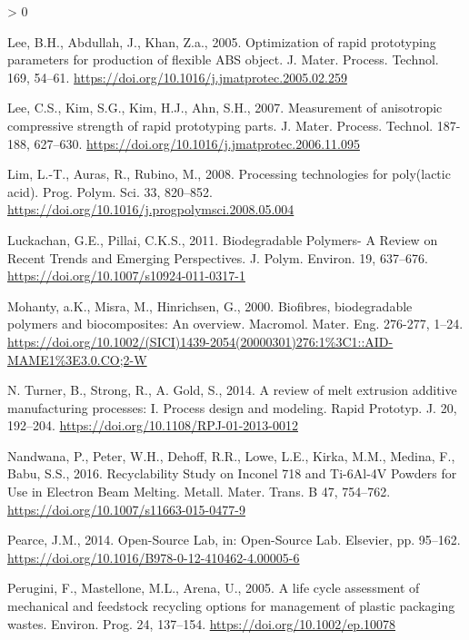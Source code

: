 \documentclass[
]{article}
\newlength{\cslhangindent}
\newenvironment{CSLReferences}[2] %
 {%
  \setlength{\parindent}{0pt}
  \ifodd #1 \everypar{\setlength{\hangindent}{\cslhangindent}}\ignorespaces\fi
  \ifnum #2 > 0
  \setlength{\parskip}{#2\baselineskip}
  \fi
 }%
 {}
\begin{document}
\begin{CSLReferences}{1}{0}
\leavevmode\hypertarget{ref-Lee2005}{}%
Lee, B.H., Abdullah, J., Khan, Z.a., 2005. {Optimization of rapid prototyping parameters for production of flexible ABS object}. J. Mater. Process. Technol. 169, 54--61. \url{https://doi.org/10.1016/j.jmatprotec.2005.02.259}

\leavevmode\hypertarget{ref-Lee2007}{}%
Lee, C.S., Kim, S.G., Kim, H.J., Ahn, S.H., 2007. {Measurement of anisotropic compressive strength of rapid prototyping parts}. J. Mater. Process. Technol. 187-188, 627--630. \url{https://doi.org/10.1016/j.jmatprotec.2006.11.095}

\leavevmode\hypertarget{ref-Lim2008}{}%
Lim, L.-T., Auras, R., Rubino, M., 2008. {Processing technologies for poly(lactic acid)}. Prog. Polym. Sci. 33, 820--852. \url{https://doi.org/10.1016/j.progpolymsci.2008.05.004}

\leavevmode\hypertarget{ref-Luckachan2011}{}%
Luckachan, G.E., Pillai, C.K.S., 2011. {Biodegradable Polymers- A Review on Recent Trends and Emerging Perspectives}. J. Polym. Environ. 19, 637--676. \url{https://doi.org/10.1007/s10924-011-0317-1}

\leavevmode\hypertarget{ref-Mohanty2000}{}%
Mohanty, a.K., Misra, M., Hinrichsen, G., 2000. {Biofibres, biodegradable polymers and biocomposites: An overview}. Macromol. Mater. Eng. 276-277, 1--24. \url{https://doi.org/10.1002/(SICI)1439-2054(20000301)276:1\%3C1::AID-MAME1\%3E3.0.CO;2-W}

\leavevmode\hypertarget{ref-NTurner2014}{}%
N. Turner, B., Strong, R., A. Gold, S., 2014. {A review of melt extrusion additive manufacturing processes: I. Process design and modeling}. Rapid Prototyp. J. 20, 192--204. \url{https://doi.org/10.1108/RPJ-01-2013-0012}

\leavevmode\hypertarget{ref-Raugel2015}{}%
Nandwana, P., Peter, W.H., Dehoff, R.R., Lowe, L.E., Kirka, M.M., Medina, F., Babu, S.S., 2016. {Recyclability Study on Inconel 718 and Ti-6Al-4V Powders for Use in Electron Beam Melting}. Metall. Mater. Trans. B 47, 754--762. \url{https://doi.org/10.1007/s11663-015-0477-9}

\leavevmode\hypertarget{ref-Pearce2014k}{}%
Pearce, J.M., 2014. {Open-Source Lab}, in: Open-Source Lab. Elsevier, pp. 95--162. \url{https://doi.org/10.1016/B978-0-12-410462-4.00005-6}

\leavevmode\hypertarget{ref-Perugini2005}{}%
Perugini, F., Mastellone, M.L., Arena, U., 2005. {A life cycle assessment of mechanical and feedstock recycling options for management of plastic packaging wastes}. Environ. Prog. 24, 137--154. \url{https://doi.org/10.1002/ep.10078}


\end{CSLReferences}
\end{document}
